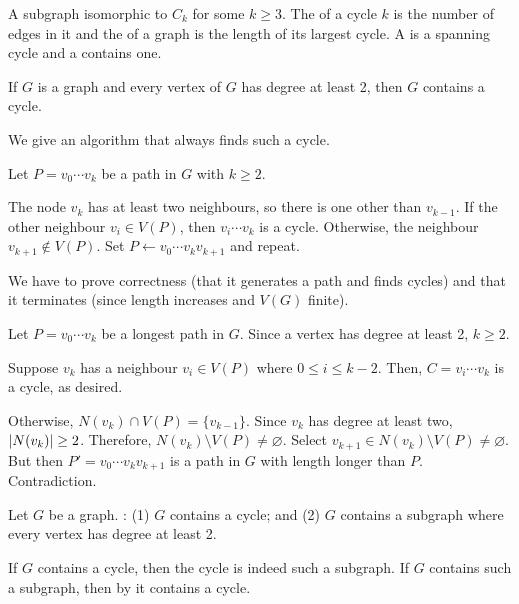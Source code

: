 \documentclass[class=math239,notes,tikz]{agony}
\begin{document}
\begin{defn}[cycle]
  A subgraph isomorphic to $C_k$ for some $k \geq 3$.
  The  of a cycle $k$ is the number of edges in it
  and the  of a graph is the length of its largest cycle.
  A  is a spanning cycle
  and a  contains one.
\end{defn}

\begin{theorem}[4.6.4]\label{thm:deg2cycle}
  If $G$ is a graph and every vertex of $G$ has degree at least 2,
  then $G$ contains a cycle.
\end{theorem}
\begin{prf}
  We give an algorithm that always finds such a cycle.

  Let $P = v_0\cdots v_k$ be a path in $G$ with $k \geq 2$.

  The node $v_k$ has at least two neighbours, so there is one other than $v_{k-1}$.
  If the other neighbour $v_i \in V(P)$,
  then $v_i \cdots v_k$ is a cycle.
  Otherwise, the neighbour $v_{k+1} \not\in V(P)$.
  Set $P \gets v_0\cdots v_k v_{k+1}$ and repeat.

  We have to prove correctness (that it generates a path and finds cycles)
  and that it terminates (since length increases and $V(G)$ finite).
\end{prf}
\begin{prf}
  Let $P = v_0 \cdots v_k$ be a longest path in $G$.
  Since a vertex has degree at least 2, $k \geq 2$.

  Suppose $v_k$ has a neighbour $v_i \in V(P)$ where $0 \leq i \leq k-2$.
  Then, $C = v_i \cdots v_k$ is a cycle, as desired.

  Otherwise, $N(v_k) \cap V(P) = \{v_{k-1}\}$.
  Since $v_k$ has degree at least two, $\abs{N(v_k)} \geq 2$.
  Therefore, $N(v_k) \setminus V(P) \neq \varnothing$.
  Select $v_{k+1} \in N(v_k) \setminus V(P) \neq \varnothing$.
  But then $P' = v_0 \cdots v_k v_{k+1}$ is a path in $G$ with length longer than $P$.
  Contradiction.
\end{prf}
\begin{corollary}\label{cor:464-pos}
  Let $G$ be a graph. \TFAE:
  (1) $G$ contains a cycle; and
  (2) $G$ contains a subgraph where every vertex has degree at least 2.
\end{corollary}
\begin{prf}
  If $G$ contains a cycle, then the cycle is indeed such a subgraph.
  If $G$ contains such a subgraph, then by  it contains a cycle.
\end{prf}
\end{document}
